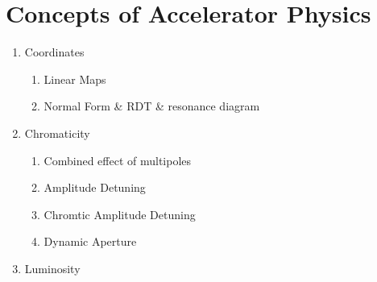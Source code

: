 \chapter{Concepts of Accelerator Physics}
\thumbforchapter{}
\chaptertoc{}
\newpage

\begin{enumerate}
    \tightlist
    \color{red}
    \item Coordinates
    \begin{enumerate}
    \tightlist
        \item Linear Maps
        \item Normal Form \& RDT \& resonance diagram
    \end{enumerate}
    \item Chromaticity
    \begin{enumerate}
    \tightlist
        \item Combined effect of multipoles
        \item Amplitude Detuning
        \item Chromtic Amplitude Detuning
        \item Dynamic Aperture
    \end{enumerate}
    \item Luminosity
\end{enumerate}








